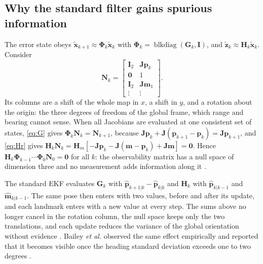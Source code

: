 \documentclass[conference]{IEEEtran}
\newcommand{\vect}[1]{\mathbf{#1}}
\begin{document}
\subsection{Why the standard filter gains spurious information}
The error state obeys $\tilde{\vect{x}}_{k+1} \approx \boldsymbol{\Phi}_k\tilde{\vect{x}}_k$ with $\boldsymbol{\Phi}_k = \operatorname{blkdiag}(\vect{G}_k, \vect{I})$, and $\tilde{\vect{z}}_k \approx \vect{H}_k\tilde{\vect{x}}_k$. Consider
\begin{equation}
\vect{N}_k = \begin{bmatrix} \vect{I}_2 & \vect{J}\vect{p}_k\\ \vect{0} & 1\\ \vect{I}_2 & \vect{J}\vect{m}_1\\ \vdots & \vdots \end{bmatrix}.
\label{eq:N}
\end{equation}
Its columns are a shift of the whole map in $x$, a shift in $y$, and a rotation about the origin: the three degrees of freedom of the global frame, which range and bearing cannot sense. When all Jacobians are evaluated at one consistent set of states, \eqref{eq:G} gives $\boldsymbol{\Phi}_k\vect{N}_k = \vect{N}_{k+1}$, because $\vect{J}\vect{p}_k + \vect{J}(\vect{p}_{k+1}-\vect{p}_k) = \vect{J}\vect{p}_{k+1}$, and \eqref{eq:Hr} gives $\vect{H}_k\vect{N}_k = \vect{H}_m[-\vect{J}\vect{p}_k - \vect{J}(\vect{m}-\vect{p}_k) + \vect{J}\vect{m}] = \vect{0}$. Hence $\vect{H}_k\boldsymbol{\Phi}_{k-1}\cdots\boldsymbol{\Phi}_0\vect{N}_0 = \vect{0}$ for all $k$: the observability matrix has a null space of dimension three and no measurement adds information along it \cite{huang2010}.

The standard EKF evaluates $\vect{G}_k$ with $\hat{\vect{p}}_{k+1|k} - \hat{\vect{p}}_{k|k}$ and $\vect{H}_k$ with $\hat{\vect{p}}_{k|k-1}$ and $\hat{\vect{m}}_{k|k-1}$. The same pose then enters with two values, before and after its update, and each landmark enters with a new value at every step. The sums above no longer cancel in the rotation column, the null space keeps only the two translations, and each update reduces the variance of the global orientation without evidence \cite{huang2008}. Bailey \emph{et al.} observed the same effect empirically and reported that it becomes visible once the heading standard deviation exceeds one to two degrees \cite{bailey2006}.
\end{document}
